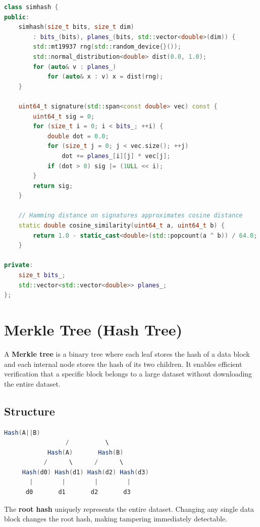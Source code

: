 \begin{lstlisting}[language=C++]
class simhash {
public:
    simhash(size_t bits, size_t dim)
        : bits_(bits), planes_(bits, std::vector<double>(dim)) {
        std::mt19937 rng(std::random_device{}());
        std::normal_distribution<double> dist(0.0, 1.0);
        for (auto& v : planes_)
            for (auto& x : v) x = dist(rng);
    }

    uint64_t signature(std::span<const double> vec) const {
        uint64_t sig = 0;
        for (size_t i = 0; i < bits_; ++i) {
            double dot = 0.0;
            for (size_t j = 0; j < vec.size(); ++j)
                dot += planes_[i][j] * vec[j];
            if (dot > 0) sig |= (1ULL << i);
        }
        return sig;
    }

    // Hamming distance on signatures approximates cosine distance
    static double cosine_similarity(uint64_t a, uint64_t b) {
        return 1.0 - static_cast<double>(std::popcount(a ^ b)) / 64.0;
    }

private:
    size_t bits_;
    std::vector<std::vector<double>> planes_;
};
\end{lstlisting}

\section{Merkle Tree (Hash Tree)}

A \textbf{Merkle tree} is a binary tree where each leaf stores the hash of a data block and each internal node stores the hash of its two children. It enables efficient verification that a specific block belongs to a large dataset without downloading the entire dataset.

\subsection{Structure}

\begin{lstlisting}[language=Java]
                  Hash(A||B)
                 /          \
            Hash(A)       Hash(B)
           /      \      /      \
     Hash(d0) Hash(d1) Hash(d2) Hash(d3)
       |        |        |        |
      d0       d1       d2       d3
\end{lstlisting}

\noindent The \textbf{root hash} uniquely represents the entire dataset. Changing any single data block changes the root hash, making tampering immediately detectable.

